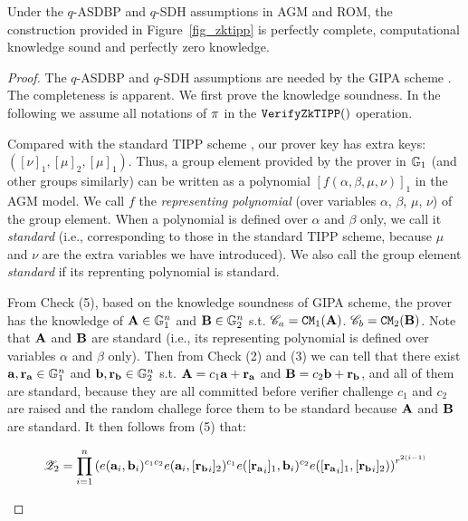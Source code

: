 \begin{lemma}\label{lemma_zktipp} Under the $q$-ASDBP and $q$-SDH assumptions
\cite{Bunz21} in AGM and ROM, the construction provided in 
Figure\ \ref{fig_zktipp} is perfectly complete, computational knowledge
sound and perfectly zero knowledge.
\end{lemma}
\begin{proof} The $q$-ASDBP and $q$-SDH assumptions are needed by the
GIPA scheme \cite{Bunz21}. The completeness is apparent. We first
prove the knowledge soundness.  In the following we assume
all notations of $\pi$ in the ${\mathtt{VerifyZkTIPP}}()$ operation.

Compared with the standard TIPP scheme \cite{Bunz21}, 
our prover key has extra keys: $([\nu]_1, [\mu]_2, [\mu]_1)$. 
Thus, a group element provided by the prover
in ${\mathbb{G}}_1$ (and other groups similarly)
can be written as a polynomial $[f(\alpha, \beta, \mu, \nu)]_1$
in the AGM model. We call $f$ the {\em representing polynomial}
(over variables $\alpha$, $\beta$, $\mu$, $\nu$)
of the group element. When a polynomial is defined over
$\alpha$ and $\beta$ only, we call it {\em standard} (i.e.,
corresponding to those in the standard TIPP scheme, because
$\mu$ and $\nu$ are the extra variables we have introduced).
We also call the group element {\em standard} if its reprenting
polynomial is standard.

From Check (5), based on the knowledge soundness of GIPA scheme,
the prover has the knowledge of ${{\mathbf {A}}} \in {\mathbb{G}}_1^n$ 
and ${{\mathbf {B}}} \in {\mathbb{G}}_2^n$ s.t.
${\mathscr{C}}_a = {\mathtt{CM}}_1({{\mathbf {A}}})$.
${\mathscr{C}}_b = {\mathtt{CM}}_2({{\mathbf {B}}})$.
Note that ${{\mathbf {A}}}$ and ${{\mathbf {B}}}$ are
standard (i.e., its representing polynomial
is defined over variables $\alpha$ and $\beta$ only).
Then from Check (2) and (3) we can tell that
there exist 
${{\mathbf {a}}}, {{\mathbf {r_a}}} \in {\mathbb{G}}_1^n$ and
${{\mathbf {b}}}, {{\mathbf {r_b}}} \in {\mathbb{G}}_2^n$
s.t. ${{\mathbf {A}}} = c_1 {{\mathbf {a}}}  + {{\mathbf {r_a}}}$
and ${{\mathbf {B}}} = c_2 {{\mathbf {b}}} + {{\mathbf {r_b}}}$,
and all of them are standard, because they are all committed
before verifier challenge $c_1$ and $c_2$ are raised and the
random challege force them to be standard because ${{\mathbf {A}}}$
and ${{\mathbf {B}}}$ are standard.
It then follows from (5) that:
\begin{small}
\begin{equation} \label{eq_z2}
  {\mathscr{Z}}_2 = \prod_{i=1}^n \left( 
  	e({{\mathbf {a}}}_i, {{\mathbf {b}}}_i)^{c_1c_2}
  	e({{\mathbf {a}}}_i, [{{\mathbf {r_b}}}_i]_2)^{c_1}
  	e({{\mathbf {[r_a}}}_i]_1, {{\mathbf {b}}}_i)^{c_2}
  	e({{\mathbf {[r_a}}}_i]_1, [{{\mathbf {r_b}}}_i]_2)
		\right)^{r^{2(i-1)}}
\end{equation}
\end{small}


\end{proof}
